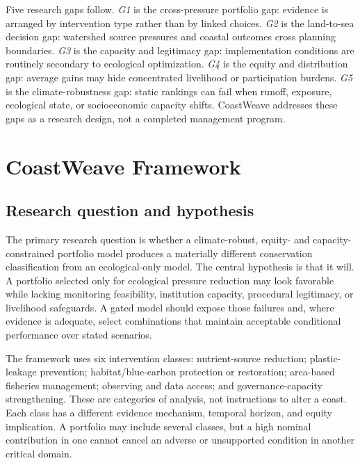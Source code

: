 \documentclass[conference]{IEEEtran}
\newcommand{\coast}{CoastWeave}
\begin{document}
Five research gaps follow. \emph{G1} is the cross-pressure portfolio gap: evidence is arranged by intervention type rather than by linked choices. \emph{G2} is the land-to-sea decision gap: watershed source pressures and coastal outcomes cross planning boundaries. \emph{G3} is the capacity and legitimacy gap: implementation conditions are routinely secondary to ecological optimization. \emph{G4} is the equity and distribution gap: average gains may hide concentrated livelihood or participation burdens. \emph{G5} is the climate-robustness gap: static rankings can fail when runoff, exposure, ecological state, or socioeconomic capacity shifts. \coast{} addresses these gaps as a research design, not a completed management program.

\section{CoastWeave Framework}

\subsection{Research question and hypothesis}

The primary research question is whether a climate-robust, equity- and capacity-constrained portfolio model produces a materially different conservation classification from an ecological-only model. The central hypothesis is that it will. A portfolio selected only for ecological pressure reduction may look favorable while lacking monitoring feasibility, institution capacity, procedural legitimacy, or livelihood safeguards. A gated model should expose those failures and, where evidence is adequate, select combinations that maintain acceptable conditional performance over stated scenarios.

The framework uses six intervention classes: nutrient-source reduction; plastic-leakage prevention; habitat/blue-carbon protection or restoration; area-based fisheries management; observing and data access; and governance-capacity strengthening. These are categories of analysis, not instructions to alter a coast. Each class has a different evidence mechanism, temporal horizon, and equity implication. A portfolio may include several classes, but a high nominal contribution in one cannot cancel an adverse or unsupported condition in another critical domain.
\end{document}
